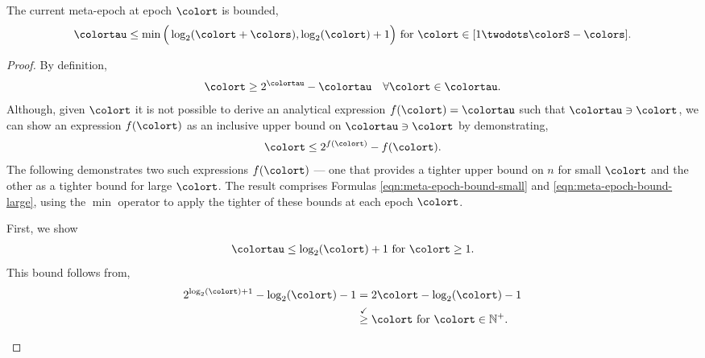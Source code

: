 \begin{lemma}
\label{thm:meta-epoch-bound}
The current meta-epoch at epoch $\colort$ is bounded,
\begin{align*}
\colortau \leq
\min\Big(
  \log_2(\colort + \colors),
  \log_2(\colort) + 1
\Big)
\text{ for } \colort \in [1 \twodots \colorS - \colors].
\end{align*}
\end{lemma}
\begin{proof}

By definition,
\begin{align*}
\colort \geq 2^{\colortau} - \colortau \quad \forall \colort \in \colortau.
\end{align*}
Although, given $\colort$ it is not possible to derive an analytical expression $f(\colort) = \colortau$ such that $\colortau \ni \colort$, we can show an expression $f(\colort)$ as an inclusive upper bound on $\colortau \ni \colort$ by demonstrating,
\begin{align*}
\colort \leq 2^{f(\colort)} - f(\colort).
\end{align*}
The following demonstrates two such expressions $f(\colort)$ --- one that provides a tighter upper bound on $n$ for small $\colort$ and the other as a tighter bound for large $\colort$.
The result comprises Formulas \ref{eqn:meta-epoch-bound-small} and \ref{eqn:meta-epoch-bound-large}, using the $\min$ operator to apply the tighter of these bounds at each epoch $\colort$.

\begin{proofpart}
First, we show
\begin{align}
\colortau \leq \log_2(\colort) + 1 \text{ for } \colort \geq 1.
\label{eqn:meta-epoch-bound-small}
\end{align}
This bound follows from,
\begin{align*}
2^{\log_{2}(\colort) + 1} - \log_2(\colort) - 1
&= 2\colort - \log_2(\colort) - 1 \\
&\stackrel{\checkmark}{\geq} \colort \text{ for } \colort \in \mathbb{N}^{+}.
\end{align*}
\end{proofpart}


\end{proof}
